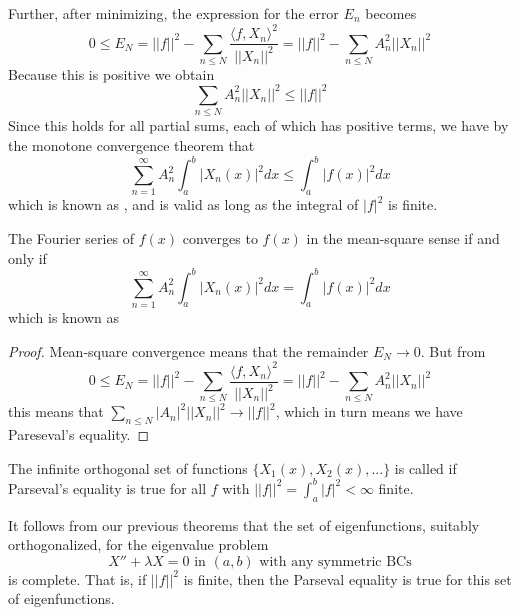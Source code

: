 \documentclass[12pt, a4paper, oneside, openright, titlepage]{book}
\begin{document}
Further, after minimizing, the expression for the error $E_n$ becomes \begin{equation*}
    0\leq E_N = ||f||^2 - \sum_{n\leq N}\frac{\langle f,X_n\rangle^2}{||X_n||^2} = ||f||^2 - \sum_{n\leq N}A_n^2||X_n||^2
\end{equation*}
Because this is positive we obtain \begin{equation*}
    \sum_{n\leq N}A_n^2||X_n||^2 \leq ||f||^2
\end{equation*}
Since this holds for all partial sums, each of which has positive terms, we have by the monotone convergence theorem that \begin{equation}
    \boxed{\sum_{n=1}^{\infty}A_n^2\int_a^b|X_n(x)|^2dx \leq \int_a^b|f(x)|^2dx}
\end{equation}
which is known as , and is valid as long as the integral of $|f|^2$ is finite.

\begin{thm}
    The Fourier series of $f(x)$ converges to $f(x)$ in the mean-square sense if and only if \begin{equation}
        \boxed{\sum_{n=1}^{\infty}A_n^2\int_a^b|X_n(x)|^2dx = \int_a^b|f(x)|^2dx}
    \end{equation}
    which is known as 
\end{thm}
\begin{proof}
    Mean-square convergence means that the remainder $E_N\rightarrow 0$. But from \begin{equation*}
        0\leq E_N = ||f||^2 - \sum_{n\leq N}\frac{\langle f,X_n\rangle^2}{||X_n||^2} = ||f||^2 - \sum_{n\leq N}A_n^2||X_n||^2
    \end{equation*}
    this means that $\sum_{n\leq N}|A_n|^2||X_n||^2\rightarrow ||f||^2$, which in turn means we have Pareseval's equality.
\end{proof}

\begin{defn}
    The infinite orthogonal set of functions $\{X_1(x),X_2(x),...\}$ is called  if Parseval's equality is true for all $f$ with $||f||^2 = \int_a^b|f|^2 < \infty$ finite.
\end{defn}
It follows from our previous theorems that the set of eigenfunctions, suitably orthogonalized, for the eigenvalue problem \begin{equation*}
    X'' + \lambda X=0\text{ in } (a,b)\text{ with any symmetric BCs}
\end{equation*}
is complete. That is, if $||f||^2$ is finite, then the Parseval equality is true for this set of eigenfunctions.
\end{document}
